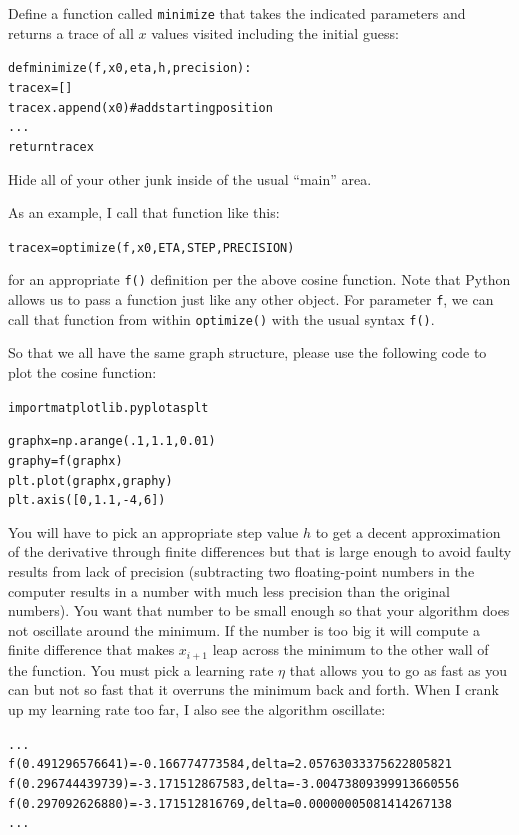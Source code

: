\begin{fullwidth}
Define a function called {\tt minimize} that takes the indicated parameters and returns a trace of all $x$ values visited including the initial guess:

\begin{alltt}
def minimize(f, x0, eta, h, precision):
    tracex = []
    tracex.append(x0)  # add starting position
    ...
    return tracex
\end{alltt}

\noindent Hide all of your other junk inside of the usual ``main'' area.

As an example, I call that function like this:

\begin{alltt}
tracex = optimize(f, x0, ETA, STEP, PRECISION)
\end{alltt}

\noindent for an appropriate {\tt f()} definition per the above cosine function.  Note that Python allows us to pass a function just like any other object.  For parameter {\tt f}, we can call that function from within {\tt optimize()} with the usual syntax {\tt f()}.

So that we all have the same graph structure, please use the following code to plot the cosine function:

\begin{alltt}
import matplotlib.pyplot as plt

graphx = np.arange(.1,1.1,0.01)
graphy = f(graphx)
plt.plot(graphx,graphy)
plt.axis([0,1.1,-4,6])
\end{alltt}

You will have to pick an appropriate step value $h$ to get a decent approximation of the derivative through finite differences but that is large enough to avoid faulty results from lack of precision (subtracting two floating-point numbers in the computer results in a number with much less precision than the original numbers). You want that number to be small enough so that your algorithm does not oscillate around the minimum. If the number is too big it will compute a finite difference that makes $x_{i+1}$ leap across the minimum to the other wall of the function. You must pick a learning rate $\eta$ that allows you to go as fast as you can but not so fast that it overruns the minimum back and forth. When I crank up my learning rate too far, I also see the algorithm oscillate:

\begin{alltt}
...
f(0.491296576641) = -0.166774773584 , delta = 2.05763033375622805821
f(0.296744439739) = -3.171512867583 , delta = -3.00473809399913660556
f(0.297092626880) = -3.171512816769 , delta = 0.00000005081414267138
...
\end{alltt}


\end{fullwidth}
